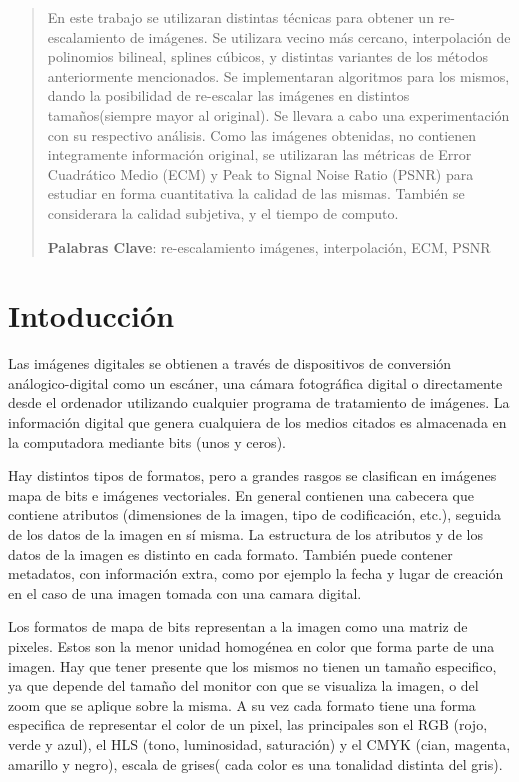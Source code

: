 \documentclass[a4paper]{article}
\newcounter{col}
\begin{document}
\setcounter{page}{1}


\begin{abstract}

En este trabajo se utilizaran distintas técnicas para obtener un re-escalamiento de imágenes. Se utilizara vecino más cercano, interpolación de polinomios bilineal, splines cúbicos, y distintas variantes de los métodos anteriormente mencionados. Se implementaran algoritmos para los mismos, dando la posibilidad de re-escalar las imágenes en distintos tamaños(siempre mayor al original). Se llevara a cabo una experimentación con su respectivo análisis. Como las imágenes obtenidas, no contienen integramente información original, se utilizaran las métricas de Error Cuadrático Medio (ECM) y Peak to Signal Noise Ratio (PSNR) para estudiar en forma cuantitativa la calidad de las mismas. También se considerara la calidad subjetiva, y el tiempo de computo. 

\textbf{Palabras Clave}: re-escalamiento imágenes, interpolación, ECM, PSNR

\end{abstract}


\section{Intoducción}

Las imágenes digitales se obtienen a través de dispositivos de conversión análogico-digital como un escáner, una cámara fotográfica digital o directamente desde el ordenador utilizando cualquier programa de tratamiento de imágenes. La información digital que genera cualquiera de los medios citados es almacenada en la computadora mediante bits (unos y ceros). 

Hay distintos tipos de formatos, pero a grandes rasgos se clasifican en imágenes mapa de bits e imágenes vectoriales. En general contienen una cabecera que contiene atributos (dimensiones de la imagen, tipo de codificación, etc.), seguida de los datos de la imagen en sí misma. La estructura de los atributos y de los datos de la imagen es distinto en cada formato. También puede contener metadatos, con información extra, como por ejemplo la fecha y lugar de creación en el caso de una imagen tomada con una camara digital.

Los formatos de mapa de bits representan a la imagen como una matriz de pixeles. Estos son la menor unidad homogénea en color que forma parte de una imagen. Hay que tener presente que los mismos no tienen un tamaño especifico, ya que depende del tamaño del monitor con que se visualiza la imagen, o del zoom que se aplique sobre la misma. A su vez cada formato tiene una forma especifica de representar el color de un pixel, las principales son el RGB (rojo, verde y azul), el HLS (tono, luminosidad, saturación) y el CMYK (cian, magenta, amarillo y negro), escala de grises( cada color es una tonalidad distinta del gris).
\end{document}
